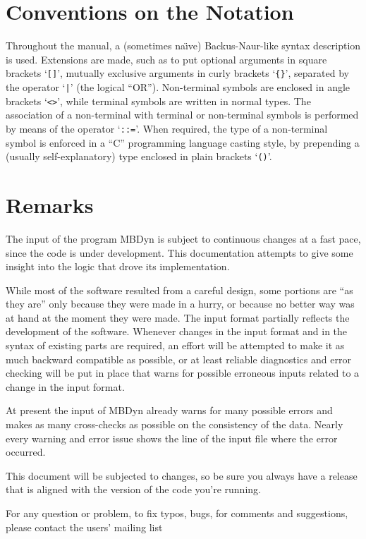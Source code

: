 \documentclass[10pt,dvips]{report}
\begin{document}
\section*{Conventions on the Notation}
Throughout the manual, a (sometimes na\"{\i}ve) 
Backus-Naur-like syntax description is used. 
Extensions are made, such as to put optional arguments in square brackets
`\texttt{[]}', mutually exclusive arguments in curly brackets `\texttt{\{\}}',
separated by the operator `\texttt{|}' (the logical ``OR'').
Non-terminal symbols are enclosed in angle brackets `\texttt{<>}', while
terminal symbols are written in normal types.
The association of a non-terminal with terminal or non-terminal
symbols is performed by means of the operator `\texttt{::=}'. 
When required, the type of a non-terminal symbol is enforced in a ``C''
programming language casting style, by prepending a (usually
self-explanatory) type enclosed in plain brackets `\texttt{()}'.


\section*{Remarks}
The input of the program MBDyn is subject to continuous changes
at a fast pace, since the code is under development.
This documentation attempts to give some insight into the logic 
that drove its implementation.

While most of the software resulted from a careful design, 
some portions are ``as they are'' only because they were made in a hurry, 
or because no better way was at hand at the moment they were made.
The input format partially reflects the development of the software.
Whenever changes in the input format and in the syntax 
of existing parts are required, an effort will be attempted to make 
it as much backward compatible as possible, or at least reliable 
diagnostics and error checking will be put in place that warns 
for possible erroneous inputs related to a change in the input format. 

At present the input of MBDyn already warns for many possible errors 
and makes as many cross-checks as possible on the consistency of the data. 
Nearly every warning and error issue shows the line of the input file 
where the error occurred. 

This document will be subjected to changes, so be sure you always have 
a release that is aligned with the version of the code you're running.

For any question or problem, to fix typos, bugs, for comments and
suggestions, please contact the users' mailing list
\end{document}

